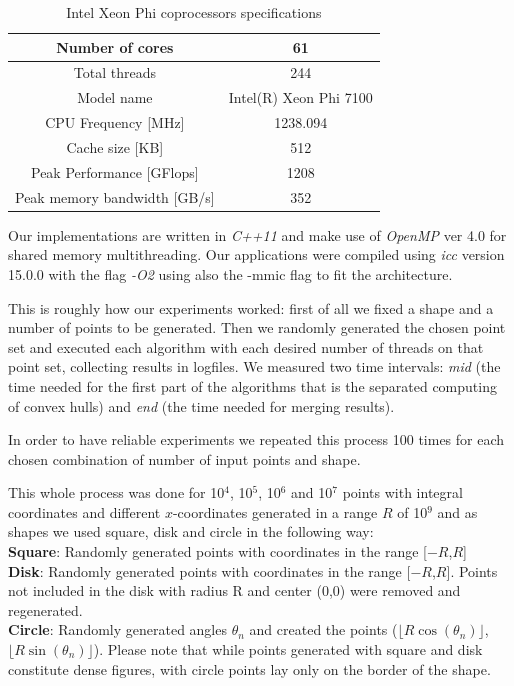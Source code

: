 \documentclass[letterpaper]{article}
\theoremstyle{definition}
\begin{document}
\begin{table}[!ht]
\begin{tabular}{|c|c|}
\hline Number of cores			& 61\\
\hline Total threads				& 244\\
\hline Model name				& Intel(R) Xeon Phi 7100\\
\hline CPU Frequency [MHz]		& 1238.094\\
\hline Cache size [KB]			& 512\\
\hline Peak Performance [GFlops]	& 1208\\
\hline Peak memory bandwidth [GB/s]		& 352\\
\hline
\end{tabular}
\caption{Intel Xeon Phi coprocessors specifications \cite{XeonPhi}}
\end{table}

Our implementations are written in \textit{C++11} and make use of \textit{OpenMP} ver 4.0 \cite{OpenMP} for shared memory multithreading.
Our applications were compiled using \textit{icc} version 15.0.0 with the flag \textit{-O2} using also the -mmic flag to fit the architecture.

This is roughly how our experiments worked:
first of all we fixed a shape and a number of points to be generated. Then we randomly generated the chosen point set and executed each algorithm with each desired number of threads on that point set, collecting results in logfiles. We measured two time intervals: \textit{mid} (the time needed for the first part of the algorithms that is the separated computing of convex hulls) and \textit{end} (the time needed for merging results).

In order to have reliable experiments we repeated this process 100 times for each chosen combination of number of input points and shape.

This whole process was done for 10$^4$, 10$^5$, 10$^6$ and 10$^7$ points with integral coordinates and different $x$-coordinates generated in a range $R$ of 10$^9$ and as shapes we used square, disk and circle in the following way:\\
{\bf Square}: Randomly generated points with coordinates in the range [$-R$,$R$]\\
{\bf Disk}: Randomly generated points with coordinates in the range [$-R$,$R$]. Points not included in the disk with radius R and center (0,0) were removed and regenerated.\\
{\bf Circle}: Randomly generated angles $\theta_n$ and created the points ($\lfloor R \cos(\theta_n)\rfloor$, $\lfloor R \sin(\theta_n)\rfloor$). Please note that while points generated with square and disk constitute dense figures, with circle points lay only on the border of the shape.
\end{document}
